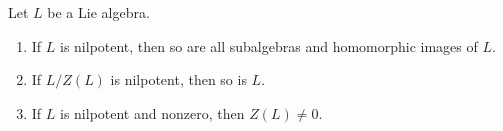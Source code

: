 Let $L$ be a Lie algebra.

\begin{enumerate}
\item[(a)] If $L$ is nilpotent, then so are all subalgebras and homomorphic images of $L$.
\item[(b)] If $L/Z(L)$ is nilpotent, then so is $L$.
\item[(c)] If $L$ is nilpotent and nonzero, then $Z(L) \neq 0$.
\end{enumerate}
